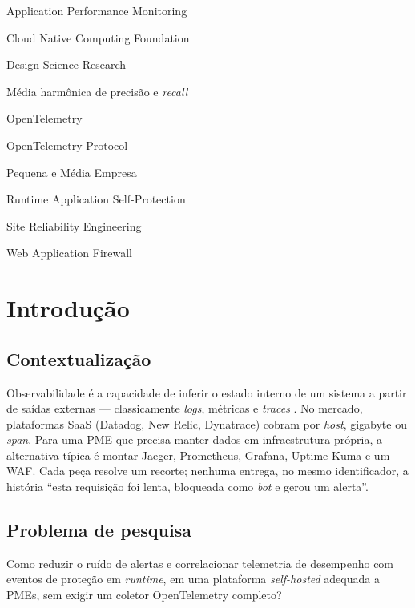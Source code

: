 \documentclass[
  12pt,
  oneside,
  a4paper,
  english,
  brazil,
  sumario=tradicional
]{abntex2}
\begin{document}
\begin{siglas}
  \item[APM] Application Performance Monitoring
  \item[CNCF] Cloud Native Computing Foundation
  \item[DSR] Design Science Research
  \item[F1] Média harmônica de precisão e \textit{recall}
  \item[OTel] OpenTelemetry
  \item[OTLP] OpenTelemetry Protocol
  \item[PME] Pequena e Média Empresa
  \item[RASP] Runtime Application Self-Protection
  \item[SRE] Site Reliability Engineering
  \item[WAF] Web Application Firewall
\end{siglas}

\tableofcontents*
\listoftables*

\chapter{Introdução}

\section{Contextualização}

Observabilidade é a capacidade de inferir o estado interno de um sistema a partir de saídas externas --- classicamente \textit{logs}, métricas e \textit{traces} \cite{cncf2023observability}. No mercado, plataformas SaaS (Datadog, New Relic, Dynatrace) cobram por \textit{host}, gigabyte ou \textit{span}. Para uma PME que precisa manter dados em infraestrutura própria, a alternativa típica é montar Jaeger, Prometheus, Grafana, Uptime Kuma e um WAF. Cada peça resolve um recorte; nenhuma entrega, no mesmo identificador, a história ``esta requisição foi lenta, bloqueada como \textit{bot} e gerou um alerta''.

\section{Problema de pesquisa}

Como reduzir o ruído de alertas e correlacionar telemetria de desempenho com eventos de proteção em \textit{runtime}, em uma plataforma \textit{self-hosted} adequada a PMEs, sem exigir um coletor OpenTelemetry completo?
\end{document}
